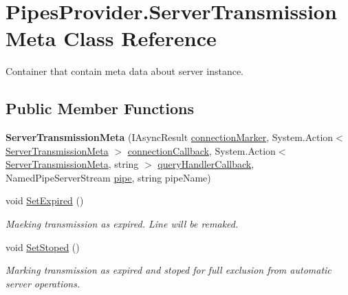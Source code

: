 \hypertarget{class_pipes_provider_1_1_server_transmission_meta}{}\section{Pipes\+Provider.\+Server\+Transmission\+Meta Class Reference}
\label{class_pipes_provider_1_1_server_transmission_meta}


Container that contain meta data about server instance.  


\subsection*{Public Member Functions}
\begin{DoxyCompactItemize}
\item 
\mbox{\label{class_pipes_provider_1_1_server_transmission_meta_a665969b5b071d7fdc931e9e9f223652b}} 
{\bfseries Server\+Transmission\+Meta} (I\+Async\+Result \mbox{\hyperlink{class_pipes_provider_1_1_server_transmission_meta_a1d4a87ad9a66bd81bc68f48fa28dbf32}{connection\+Marker}}, System.\+Action$<$ \mbox{\hyperlink{class_pipes_provider_1_1_server_transmission_meta}{Server\+Transmission\+Meta}} $>$ \mbox{\hyperlink{class_pipes_provider_1_1_server_transmission_meta_a6e9fa5426107e5d4265273e5be439a62}{connection\+Callback}}, System.\+Action$<$ \mbox{\hyperlink{class_pipes_provider_1_1_server_transmission_meta}{Server\+Transmission\+Meta}}, string $>$ \mbox{\hyperlink{class_pipes_provider_1_1_server_transmission_meta_aa663870a4d61945bcedd85721ede42a5}{query\+Handler\+Callback}}, Named\+Pipe\+Server\+Stream \mbox{\hyperlink{class_pipes_provider_1_1_server_transmission_meta_a8b2ff8796056a5a2fbe0dbb4c4fd5dab}{pipe}}, string pipe\+Name)
\item 
void \mbox{\hyperlink{class_pipes_provider_1_1_server_transmission_meta_a29b2b6d3e06632b362a2101b12f082f7}{Set\+Expired}} ()
\begin{DoxyCompactList}\small\item\em Maeking transmission as expired. Line will be remaked. \end{DoxyCompactList}\item 
void \mbox{\hyperlink{class_pipes_provider_1_1_server_transmission_meta_acf5d5cd3ea8799d979a0208d8ae50ff1}{Set\+Stoped}} ()
\begin{DoxyCompactList}\small\item\em Marking transmission as expired and stoped for full exclusion from automatic server operations. \end{DoxyCompactList}\end{DoxyCompactItemize}
